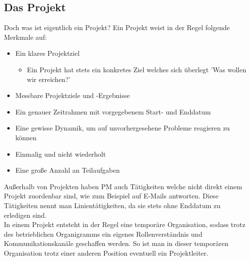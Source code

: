 \documentclass{article}
\begin{document}
	\subsection{Das Projekt}
	Doch was ist eigentlich ein Projekt? Ein Projekt weist in der Regel folgende Merkmale auf:
	\begin{itemize}
		\item{Ein klares Projektziel}
		\begin{itemize}
			\item{Ein Projekt hat stets ein konkretes Ziel welches sich überlegt 'Was wollen wir erreichen?'}
		\end{itemize}
		\item{Messbare Projektziele und -Ergebnisse}
		\item{Ein genauer Zeitrahmen mit vorgegebenem Start- und Enddatum}
		\item{Eine gewisse Dynamik, um auf unvorhergesehene Probleme reagieren zu können}
		\item{Einmalig und nicht wiederholt}
		\item{Eine große Anzahl an Teilaufgaben}
	\end{itemize}
	Außerhalb von Projekten haben PM auch Tätigkeiten welche nicht direkt einem Projekt zuordenbar sind, wie zum Beispiel auf E-Mails antworten. Diese Tätigkeiten nennt man Linientätigkeiten, da sie stets ohne Enddatum zu erledigen sind. \\
	In einem Projekt entsteht in der Regel eine temporäre Organisation, sodass trotz des betrieblichen Organigramms ein eigenes Rollenverständnis und Kommunikationskanäle geschaffen werden. So ist man in dieser temporären Organisation trotz einer anderen Position eventuell ein Projektleiter.
\end{document}
